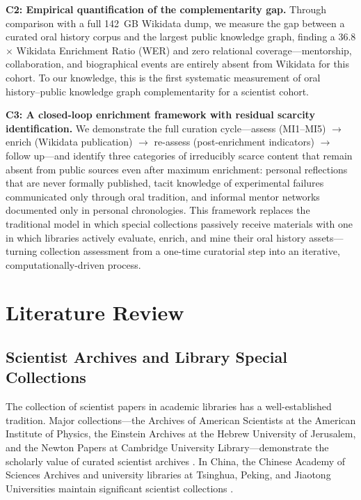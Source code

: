 \documentclass[review]{elsarticle}
\begin{document}
\textbf{C2: Empirical quantification of the complementarity gap.} Through comparison with a full 142~GB Wikidata dump, we measure the gap between a curated oral history corpus and the largest public knowledge graph, finding a 36.8$\times$ Wikidata Enrichment Ratio (WER) and zero relational coverage---mentorship, collaboration, and biographical events are entirely absent from Wikidata for this cohort. To our knowledge, this is the first systematic measurement of oral history--public knowledge graph complementarity for a scientist cohort.

\textbf{C3: A closed-loop enrichment framework with residual scarcity identification.} We demonstrate the full curation cycle---assess (MI1--MI5) $\rightarrow$ enrich (Wikidata publication) $\rightarrow$ re-assess (post-enrichment indicators) $\rightarrow$ follow up---and identify three categories of irreducibly scarce content that remain absent from public sources even after maximum enrichment: personal reflections that are never formally published, tacit knowledge of experimental failures communicated only through oral tradition, and informal mentor networks documented only in personal chronologies. This framework replaces the traditional model in which special collections passively receive materials with one in which libraries actively evaluate, enrich, and mine their oral history assets---turning collection assessment from a one-time curatorial step into an iterative, computationally-driven process.

\section{Literature Review}

\subsection{Scientist Archives and Library Special Collections}

The collection of scientist papers in academic libraries has a well-established tradition. Major collections---the Archives of American Scientists at the American Institute of Physics, the Einstein Archives at the Hebrew University of Jerusalem, and the Newton Papers at Cambridge University Library---demonstrate the scholarly value of curated scientist archives \cite{hunter2017archives}. In China, the Chinese Academy of Sciences Archives and university libraries at Tsinghua, Peking, and Jiaotong Universities maintain significant scientist collections \cite{zhang2018scientific}.
\end{document}
